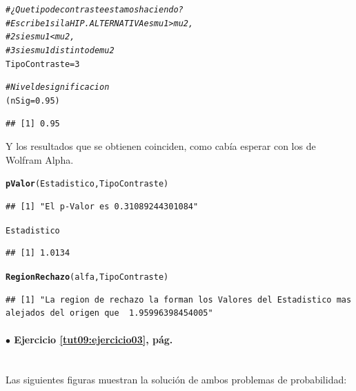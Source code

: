 \documentclass[10pt,a4paper]{article}\usepackage[]{graphicx}\usepackage[]{color}
\makeatletter
\newcommand{\hlnum}[1]{\textcolor[rgb]{0.686,0.059,0.569}{#1}}%
\newcommand{\hlcom}[1]{\textcolor[rgb]{0.678,0.584,0.686}{\textit{#1}}}%
\newcommand{\hlstd}[1]{\textcolor[rgb]{0.345,0.345,0.345}{#1}}%
\newcommand{\hlkwb}[1]{\textcolor[rgb]{0.69,0.353,0.396}{#1}}%
\newcommand{\hlkwd}[1]{\textcolor[rgb]{0.737,0.353,0.396}{\textbf{#1}}}%
\newenvironment{kframe}{%
 \def\at@end@of@kframe{}%
 \ifinner\ifhmode%
  \def\at@end@of@kframe{\end{minipage}}%
  \begin{minipage}{\columnwidth}%
 \fi\fi%
 \def\FrameCommand##1{\hskip\@totalleftmargin \hskip-\fboxsep
 \colorbox{shadecolor}{##1}\hskip-\fboxsep
     \hskip-\linewidth \hskip-\@totalleftmargin \hskip\columnwidth}%
 \MakeFramed {\advance\hsize-\width
   \@totalleftmargin\z@ \linewidth\hsize
   \@setminipage}}%
 {\par\unskip\endMakeFramed%
 \at@end@of@kframe}
\newenvironment{knitrout}{}{} %
\newcounter {cont01}
\makeatother
\begin{document}
{\begin{enumerate}
\begin{knitrout}
\begin{kframe}
\begin{alltt}
  \hlcom{# ¿Que tipo de contraste estamos haciendo?}
  \hlcom{# Escribe 1 si la HIP. ALTERNATIVA es mu1 > mu2,}
  \hlcom{#         2 si es mu1 < mu2,}
  \hlcom{#         3 si es mu1 distinto de mu2}
  \hlstd{TipoContraste} \hlkwb{=} \hlnum{3}

  \hlcom{#Nivel de significacion}
   \hlstd{(nSig} \hlkwb{=} \hlnum{0.95}\hlstd{)}
\end{alltt}
\begin{verbatim}
## [1] 0.95
\end{verbatim}
\end{kframe}
\end{knitrout}


Y los resultados que se obtienen coinciden, como cabía esperar con  los de Wolfram Alpha.
\begin{knitrout}
\color{fgcolor}\begin{kframe}
\begin{alltt}
      \hlkwd{pValor}\hlstd{(Estadistico, TipoContraste)}
\end{alltt}
\begin{verbatim}
## [1] "El p-Valor es 0.31089244301084"
\end{verbatim}
\begin{alltt}
      \hlstd{Estadistico}
\end{alltt}
\begin{verbatim}
## [1] 1.0134
\end{verbatim}
\begin{alltt}
      \hlkwd{RegionRechazo}\hlstd{(alfa, TipoContraste)}
\end{alltt}
\begin{verbatim}
## [1] "La region de rechazo la forman los Valores del Estadistico mas alejados del origen que  1.95996398454005"
\end{verbatim}
\end{kframe}
\end{knitrout}



\end{enumerate}

\paragraph{\bf $\bullet$ Ejercicio \ref{tut09:ejercicio03}, pág. \pageref{tut09:ejercicio03}}
\label{tut09:ejercicio03:sol}\quad\\

Las siguientes figuras muestran la solución de ambos problemas de probabilidad:

}
\end{document}
